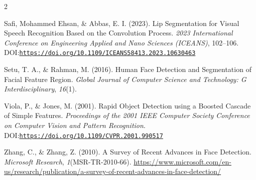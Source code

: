 \documentclass[9pt]{extarticle}
\begin{document}
\begin{multicols}{2}
\begin{list}{}{
    \setlength{\leftmargin}{1.5em}
    \setlength{\itemindent}{-1.5em}
    \setlength{\parsep}{0pt}
    \setlength{\itemsep}{6pt}
}
\item \hypertarget{ref:18}{}Safi, Mohammed Ehsan, \& Abbas, E. I. (2023). Lip Segmentation for Visual Speech Recognition Based on the Convolution Process. \textit{2023 International Conference on Engineering Applied and Nano Sciences (ICEANS)}, 102–106. DOI:\href{https://doi.org/10.1109/ICEANS58413.2023.10630463}{{\nolinkurl{https://doi.org/10.1109/ICEANS58413.2023.10630463}}}

\item \hypertarget{ref:19}{}Setu, T. A., \& Rahman, M. (2016). Human Face Detection and Segmentation of Facial Feature Region. \textit{Global Journal of Computer Science and Technology: G Interdisciplinary}, \textit{16}(1).

\item \hypertarget{ref:20}{}Viola, P., \& Jones, M. (2001). Rapid Object Detection using a Boosted Cascade of Simple Features. \textit{Proceedings of the 2001 IEEE Computer Society Conference on Computer Vision and Pattern Recognition}. DOI:\href{https://doi.org/10.1109/CVPR.2001.990517}{{\nolinkurl{https://doi.org/10.1109/CVPR.2001.990517}}}

\item \hypertarget{ref:21}{}Zhang, C., \& Zhang, Z. (2010). A Survey of Recent Advances in Face Detection. \textit{Microsoft Research}, \textit{1}(MSR-TR-2010-66). \url{https://www.microsoft.com/en-us/research/publication/a-survey-of-recent-advances-in-face-detection/}

\end{list}
\end{multicols}
\end{document}

